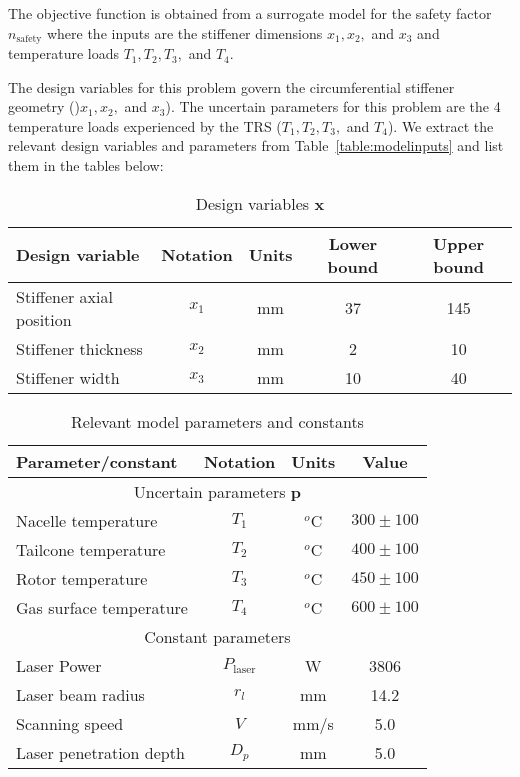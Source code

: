 The objective function is obtained from a surrogate model for the safety factor $n_{\textrm{safety}}$ where the inputs are the stiffener dimensions $x_1,x_2,$ and $x_3$ and temperature loads $T_1,T_2,T_3,$ and $T_4$.

The design variables for this problem govern the circumferential stiffener geometry ()$x_1,x_2,$ and $x_3$). The uncertain parameters for this problem are the 4 temperature loads experienced by the \ac{TRS} ($T_1,T_2,T_3,$ and $T_4$). We extract the relevant design variables and parameters from Table~\ref{table:modelinputs} and list them in the tables below:


\begin{table}[h!]
    \centering
    \renewcommand{\arraystretch}{1.0}%
    \small\addtolength{\tabcolsep}{-2pt}
    \caption{Design variables ${\textbf{x}}$}
    \label{table:STOmodelinputs}
    \begin{tabular}{lcccc}
    \hline\hline
    \bf Design variable & \bf Notation & \bf Units & \bf Lower bound & \bf Upper bound \\
    \hline
    Stiffener axial position & $x_1$ & mm & 37 & 145 \\
    Stiffener thickness  & $x_2$ & mm & 2 & 10 \\
    Stiffener width & $x_3$ & mm & 10 & 40  \\
    \hline\hline
    \end{tabular}
\end{table}

\begin{table}[h!]
	\centering
	\renewcommand{\arraystretch}{1.0}%
	\small\addtolength{\tabcolsep}{-2pt}
	\caption{Relevant model parameters and constants}
	\label{table:STOmodelparameters}
	\begin{tabular}{lccc}
	\hline\hline
	\bf Parameter/constant & \bf Notation & \bf Units & \bf Value \\
	\hline
    \multicolumn{4}{c}{Uncertain parameters $\mathbf{p}$} \\ 
	Nacelle temperature & $T_1$ & $^{o}$C & $300 \pm 100$ \\ 
	Tailcone temperature & $T_2$ & $^{o}$C & $400 \pm 100$ \\ 
	Rotor temperature & $T_3$ & $^{o}$C & $450 \pm 100$ \\ 
	Gas surface temperature & $T_4$ & $^{o}$C & $600 \pm 100$ \\ \hline
    \multicolumn{4}{c}{Constant parameters} \\
	Laser Power & ${P_\textrm{laser}}$ & W &  3806 \\ 
	Laser beam radius & ${r_l}$ & mm & 14.2 \\ 
	Scanning speed& ${V}$ & mm/s & 5.0 \\ 
	Laser penetration depth & $D_p$ & mm & 5.0 \\
	\hline\hline
	\end{tabular}
\end{table}

